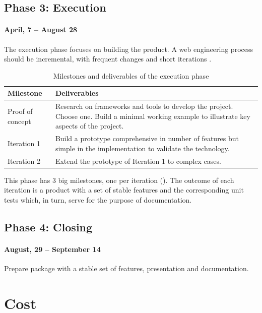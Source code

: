\subsection{Phase 3: Execution}
\paragraph{April, 7 -- August 28}
The execution phase focuses on building the product. 
A web engineering process should be incremental, with frequent changes and short iterations \cite{Kappel:2006}.

\begin{table}[ht]
    \centering
    \begin{tabularx}{\linewidth}{| X | X |}
    \hline
    Milestone & Deliverables \\
    \hline
    Proof of concept & Research on frameworks and tools to develop the project. Choose one. Build a minimal working example to illustrate key aspects of the project. \\ \hline
    Iteration 1 & Build a prototype comprehensive in number of features but simple in the implementation to validate the technology. \\ \hline
    Iteration 2 & Extend the prototype of Iteration 1 to complex cases. \\
    \hline
    \end{tabularx}
    \caption{Milestones and deliverables of the execution phase}
    \label{tab:milestones}
\end{table}

This phase has 3 big milestones, one per iteration (). 
The outcome of each iteration is a product with a set of stable features and the corresponding unit tests which, in turn, serve for the purpose of documentation.

\subsection{Phase 4: Closing}
\paragraph{August, 29 -- September 14}
Prepare package with a stable set of features, presentation and documentation.

\FloatBarrier

\section{Cost}

